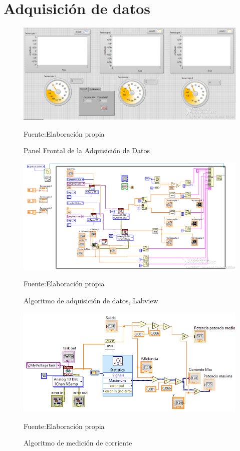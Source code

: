 

\renewcommand{\appendixname}{Anexo}
\renewcommand{\appendixtocname}{Anexo}
\renewcommand{\appendixpagename}{Anexo}

\appendix

\chapter{Adquisición de datos}


\begin{figure}[H]
\centering
\includegraphics[width=\linewidth]{Figuras/lab3.png} %
\caption{Panel Frontal de la Adquisición de Datos}
\centering
Fuente:Elaboración propia
\label{anexo2}
\end{figure}

\vfill

\begin{figure}[h]
\centering
\includegraphics[width=\linewidth]{Figuras/lab1.png}
\caption{Algoritmo de adquisición de datos, Labview}
\centering
Fuente:Elaboración propia
\label{anexo3}
\end{figure}

\vfill
\begin{figure}[H]
\centering
\includegraphics[width=\linewidth]{Figuras/lab2.png} %
\caption{Algoritmo de medición de corriente}
\centering
Fuente:Elaboración propia
\label{anexo4}
\end{figure}
\vfill

